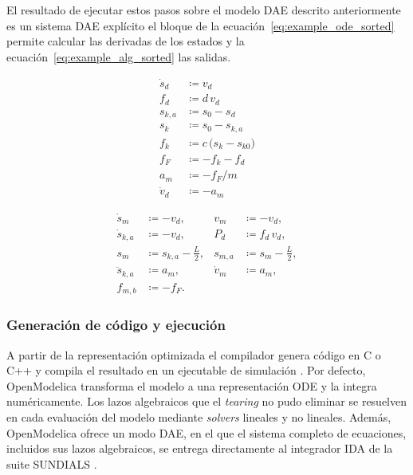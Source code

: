 El resultado de ejecutar estos pasos sobre el modelo DAE descrito anteriormente es un sistema DAE explícito el bloque de la ecuación~\ref{eq:example_ode_sorted} permite calcular las derivadas de los estados y la ecuación~\ref{eq:example_alg_sorted} las salidas.

\begin{subequations}
	\label{eq:example_ode_sorted}
	\begin{align}
		\dot{s}_d &\coloneqq v_d \\
		f_d       &\coloneqq d\, v_d \\
		s_{k,a}   &\coloneqq s_0 - s_d \\
		s_k       &\coloneqq s_0 - s_{k,a} \\
		f_k       &\coloneqq c\,\bigl(s_k - s_{k0}\bigr) \\
		f_F       &\coloneqq -f_k - f_d \\
		a_m       &\coloneqq -f_F / m \\
		\dot{v}_d &\coloneqq -a_m
	\end{align}
\end{subequations}

\begin{subequations}
	\label{eq:example_alg_sorted}
	\begin{align}
		\dot{s}_m &\coloneqq -v_d, & v_m &\coloneqq -v_d, \\
		\dot{s}_{k,a} &\coloneqq -v_d, & P_d &\coloneqq f_d\, v_d, \\
		s_m &\coloneqq s_{k,a} - \tfrac{L}{2}, & s_{m,a} &\coloneqq s_m - \tfrac{L}{2}, \\
		\ddot{s}_{k,a} &\coloneqq a_m, & \dot{v}_m &\coloneqq a_m, \\
		f_{m,b} &\coloneqq -f_F. & &
	\end{align}
\end{subequations}

\subsubsection{Generación de código y ejecución}
A partir de la representación optimizada el compilador genera código en C o C++ y compila el resultado en un ejecutable de simulación \cite{om_compiler}. Por defecto, OpenModelica transforma el modelo a una representación ODE y la integra numéricamente. Los lazos algebraicos que el \textit{tearing} no pudo eliminar se resuelven en cada evaluación del modelo mediante \textit{solvers} lineales y no lineales. Además, OpenModelica ofrece un modo DAE, en el que el sistema completo de ecuaciones, incluidos sus lazos algebraicos, se entrega directamente al integrador IDA de la suite SUNDIALS \cite{om_solving}.


